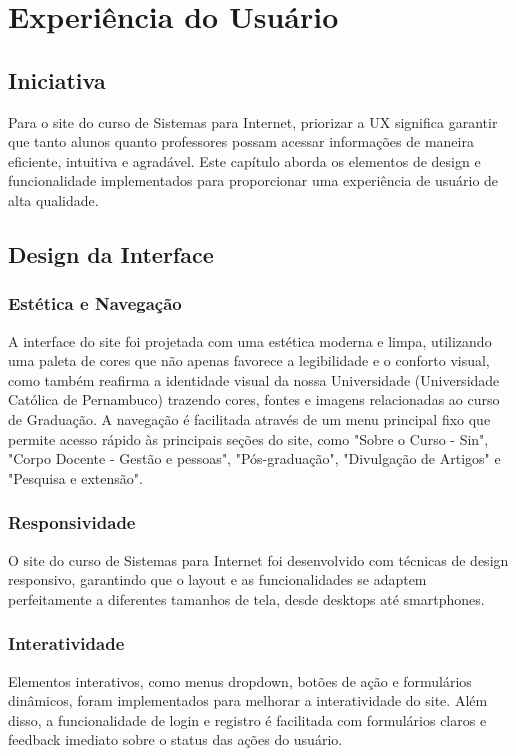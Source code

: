 \documentclass[a4paper,12pt]{report}
\begin{document}
\chapter{Experiência do Usuário}
 
\section{Iniciativa}
Para o site do curso de Sistemas para Internet, priorizar a UX significa garantir que tanto alunos quanto professores possam acessar informações de maneira eficiente, intuitiva e agradável. Este capítulo aborda os elementos de design e funcionalidade implementados para proporcionar uma experiência de usuário de alta qualidade.
 
\section{Design da Interface}
\subsection{Estética e Navegação}
A interface do site foi projetada com uma estética moderna e limpa, utilizando uma paleta de cores que não apenas favorece a legibilidade e o conforto visual, como também reafirma a identidade visual da nossa Universidade (Universidade Católica de Pernambuco) trazendo cores, fontes e imagens relacionadas ao curso de Graduação. A navegação é facilitada através de um menu principal fixo que permite acesso rápido às principais seções do site, como "Sobre o Curso - Sin", "Corpo Docente - Gestão e pessoas", "Pós-graduação", "Divulgação de Artigos" e "Pesquisa e extensão".

\subsection{Responsividade}
O site do curso de Sistemas para Internet foi desenvolvido com técnicas de design responsivo, garantindo que o layout e as funcionalidades se adaptem perfeitamente a diferentes tamanhos de tela, desde desktops até smartphones.
 
\subsection{Interatividade}
Elementos interativos, como menus dropdown, botões de ação e formulários dinâmicos, foram implementados para melhorar a interatividade do site. Além disso, a funcionalidade de login e registro é facilitada com formulários claros e feedback imediato sobre o status das ações do usuário.
\end{document}
